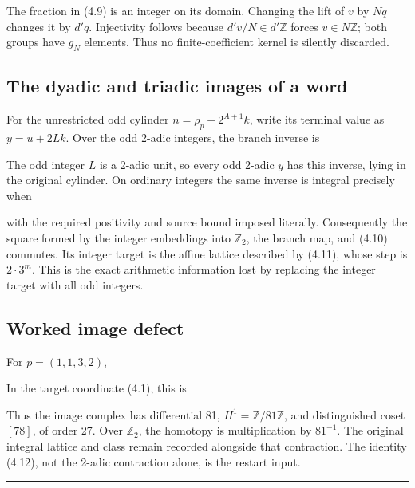 The fraction in (4.9) is an integer on its domain. Changing the lift of
\(v\) by \(Nq\) changes it by \(d'q\). Injectivity follows because
\(d'v/N\in d'\mathbb Z\) forces \(v\in N\mathbb Z\); both groups have
\(g_N\) elements. Thus no finite-coefficient kernel is silently
discarded.

\subsection{The dyadic and triadic images of a word}

For the unrestricted odd cylinder \(n=\rho_p+2^{A+1}k\), write its
terminal value as \(y=u+2Lk\). Over the odd 2-adic integers, the branch
inverse is


The odd integer \(L\) is a 2-adic unit, so every odd 2-adic \(y\) has
this inverse, lying in the original cylinder. On ordinary integers the
same inverse is integral precisely when


with the required positivity and source bound imposed literally.
Consequently the square formed by the integer embeddings into
\(\mathbb Z_2\), the branch map, and (4.10) commutes. Its integer target
is the affine lattice described by (4.11), whose step is \(2\cdot3^m\).
This is the exact arithmetic information lost by replacing the integer
target with all odd integers.

\subsection{Worked image defect}

For \(p=(1,1,3,2)\),


In the target coordinate (4.1), this is


Thus the image complex has differential 81,
\(H^1=\mathbb Z/81\mathbb Z\), and distinguished coset \([78]\), of
order 27. Over \(\mathbb Z_2\), the homotopy is multiplication by
\(81^{-1}\). The original integral lattice and class remain recorded
alongside that contraction. The identity (4.12), not the 2-adic
contraction alone, is the restart input.

\begin{center}\rule{0.5\linewidth}{0.5pt}\end{center}

